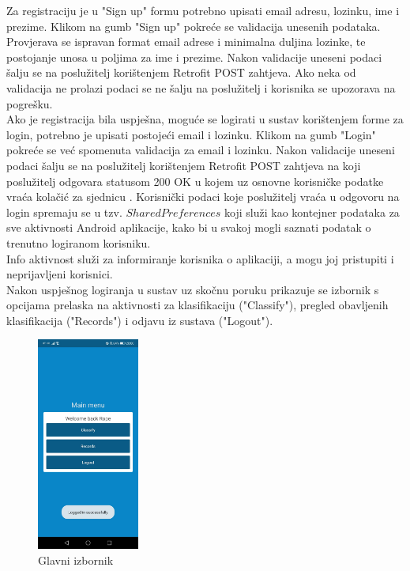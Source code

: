 \documentclass[times, utf8, zavrsni]{fer}
\begin{document}
Za registraciju je u "Sign up" formu potrebno upisati email adresu, lozinku, ime i prezime. Klikom na gumb "Sign up" pokreće se validacija unesenih podataka. Provjerava se ispravan format email adrese i minimalna duljina lozinke, te postojanje unosa u poljima za ime i prezime. Nakon validacije uneseni podaci šalju se na poslužitelj korištenjem Retrofit POST zahtjeva. Ako neka od validacija ne prolazi podaci se ne šalju na poslužitelj i korisnika se upozorava na pogrešku.\\
%
\indent{}
Ako je registracija bila uspješna, moguće se logirati u sustav korištenjem forme za login, potrebno je upisati postojeći email i lozinku. Klikom na gumb "Login" pokreće se već spomenuta validacija za email i lozinku. Nakon validacije uneseni podaci šalju se na poslužitelj korištenjem Retrofit POST zahtjeva na koji poslužitelj odgovara statusom 200 OK u kojem uz osnovne korisničke podatke vraća kolačić za sjednicu . Korisnički podaci koje poslužitelj vraća u odgovoru na login spremaju se u tzv. $Shared Preferences$ koji služi kao kontejner podataka za sve aktivnosti Android aplikacije, kako bi u svakoj mogli saznati podatak o trenutno logiranom korisniku.\\
%
\indent{}
Info aktivnost služi za informiranje korisnika o aplikaciji, a mogu joj pristupiti i neprijavljeni korisnici.\\
Nakon uspješnog logiranja u sustav uz skočnu poruku prikazuje se izbornik s opcijama prelaska na aktivnosti za klasifikaciju ("Classify"), pregled obavljenih klasifikacija ("Records") i odjavu iz sustava ("Logout").
%
\begin{figure}[!h]
\centering
\includegraphics[width=0.3\textwidth]{./slike/app6}
\caption{Glavni izbornik}
\label{fig:app6}
\end{figure}
\end{document}
